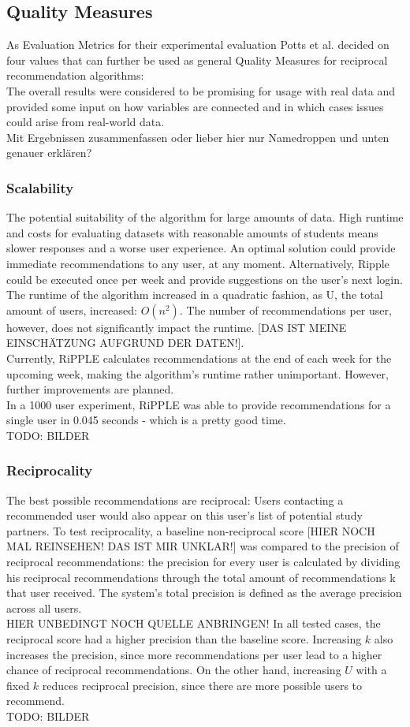 \documentclass[nochapterpage,bigchapter,linedtoc,longdoc,colorback,accentcolor=tud3b]{tudreport}
\begin{document}
\subsection{Quality Measures}
As Evaluation Metrics for their experimental evaluation Potts et al. decided on four values that can further be used as general Quality Measures for reciprocal recommendation algorithms:\\
The overall results were considered to be promising for usage with real data and provided some input on how variables are connected and in which cases issues could arise from real-world data.\\
Mit Ergebnissen zusammenfassen oder lieber hier nur Namedroppen und unten genauer erklären?\\	
\subsubsection{Scalability} The potential suitability of the algorithm for large amounts of data. High runtime and costs for evaluating datasets with reasonable amounts of students means slower responses and a worse user experience. An optimal solution could provide immediate recommendations to any user, at any moment. Alternatively, Ripple could be executed once per week and provide suggestions on the user's next login.\\
The runtime of the algorithm increased in a quadratic fashion, as U, the total amount of users, increased: \(O(n^2)\). The number of recommendations per user, however, does not significantly impact the runtime. [DAS IST MEINE EINSCHÄTZUNG AUFGRUND DER DATEN!].\\
Currently, RiPPLE calculates recommendations at the end of each week for the upcoming week, making the algorithm's runtime rather unimportant. However, further improvements are planned.\\
In a 1000 user experiment, RiPPLE was able to provide recommendations for a single user in 0.045 seconds - which is a pretty good time.\\
TODO: BILDER
\subsubsection{Reciprocality} The best possible recommendations are reciprocal: Users contacting a recommended user would also appear on this user's list of potential study partners. To test reciprocality, a baseline non-reciprocal score [HIER NOCH MAL REINSEHEN! DAS IST MIR UNKLAR!] was compared to the precision of reciprocal recommendations: the precision for every user is calculated by dividing his reciprocal recommendations through the total amount of recommendations k that user received. The system's total precision is defined as the average precision across all users.\\ HIER UNBEDINGT NOCH QUELLE ANBRINGEN!
In all tested cases, the reciprocal score had a higher precision than the baseline score. Increasing \(k\) also increases the precision, since more recommendations per user lead to a higher chance of reciprocal recommendations. On the other hand, increasing \(U\) with a fixed \(k\) reduces reciprocal precision, since there are more possible users to recommend.\\
TODO: BILDER
\end{document}
